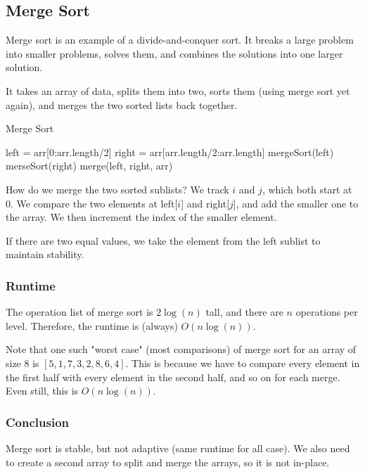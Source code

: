 
\subsection{Merge Sort}

Merge sort is an example of a divide-and-conquer sort. It breaks a large problem into smaller problems, solves them, and combines the solutions into one larger solution.

It takes an array of data, splits them into two, sorts them (using merge sort yet again), and merges the two sorted lists back together.

\begin{algorithm}
	\caption{Merge Sort}
	left = arr[0:arr.length/2]\;
	right = arr[arr.length/2:arr.length]\;
	mergeSort(left)\;
	merseSort(right)\;
	merge(left, right, arr)\;
\end{algorithm}

How do we merge the two sorted sublists? We track \( i \) and \( j \), which both start at 0. We compare the two elements at left[\( i \)] and right[\( j \)], and add the smaller one to the array. We then increment the index of the smaller element. 

\begin{note}
	If there  are two equal values, we take the element from the left sublist to maintain stability.
\end{note}

\subsubsection{Runtime}
The operation list of merge sort is \( 2\log (n) \) tall, and there are \( n \) operations per level. Therefore, the runtime is (always) \( O(n\log (n)) \).

\begin{note}
	Note that one such "worst case" (most comparisons) of merge sort for an array of size 8 is \([5, 1, 7, 3, 2, 8, 6, 4]\). This is because we have to compare every element in the first half with every element in the second half, and so on for each merge. Even still, this is \( O(n\log (n)) \).
\end{note}

\subsubsection{Conclusion}
Merge sort is stable, but not adaptive (same runtime for all case). We also need to create a second array to split and merge the arrays, so it is not in-place.

